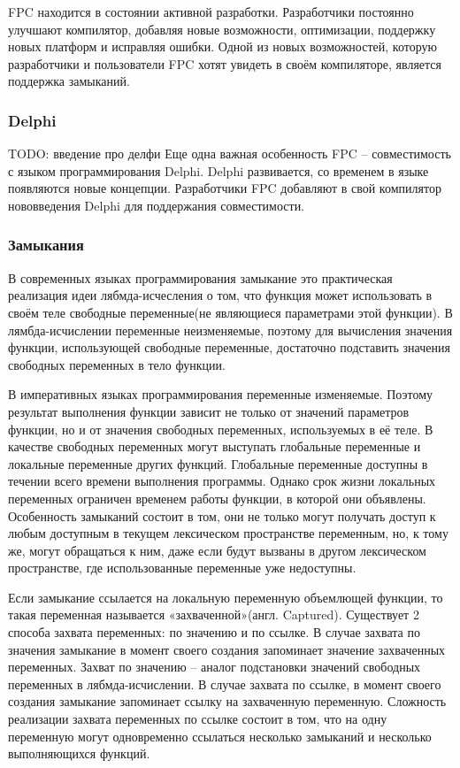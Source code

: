 \documentclass{imcs}
\begin{document}
FPC находится в состоянии активной разработки. Разработчики постоянно улучшают компилятор,
добавляя новые возможности, оптимизации, поддержку новых платформ и
исправляя ошибки\cite{fpc}.
Одной из новых возможностей, которую разработчики и пользователи FPC хотят увидеть в
своём компиляторе, является поддержка замыканий.

\subsubsection{Delphi}

TODO: введение про делфи
Еще одна важная особенность FPC -- совместимость с языком программирования Delphi.
Delphi развивается, со временем в языке появляются новые концепции. Разработчики FPC
добавляют в свой компилятор нововведения Delphi для поддержания совместимости.

\subsubsection{Замыкания}
В современных языках программирования замыкание это практическая реализация
идеи лябмда-исчесления о том, что функция может использовать в своём теле свободные
переменные(не являющиеся параметрами этой функции). В лямбда-исчислении
переменные неизменяемые, поэтому для вычисления значения функции, использующей
свободные переменные, достаточно подставить значения свободных переменных в тело
функции\cite{lambdatutor}.

В императивных языках программирования переменные изменяемые.
Поэтому результат выполнения функции зависит не только от значений параметров
функции, но и от значения свободных переменных, используемых в её теле. В качестве
свободных переменных могут выступать глобальные переменные и локальные переменные
других функций. Глобальные переменные доступны в течении всего времени выполнения программы.
Однако срок жизни
локальных переменных ограничен временем работы функции, в которой они объявлены.
Особенность замыканий состоит в том, они не только могут получать доступ к любым
доступным в текущем лексическом пространстве переменным, но, к тому же, могут
обращаться к ним, даже если будут вызваны в другом лексическом пространстве, где
использованные переменные уже недоступны.

Если замыкание ссылается на локальную переменную объемлющей функции, то такая переменная 
называется «захваченной»(англ. Captured)\cite{anonymmethods}\cite{cpp}. Существует 2
способа захвата переменных: по значению и по ссылке. В случае захвата по значения
замыкание в момент своего создания запоминает значение захваченных переменных.
Захват по значению -- аналог подстановки значений свободных переменных в лябмда-исчислении.
В случае захвата по ссылке, в момент своего создания замыкание запоминает ссылку 
на захваченную переменную. Сложность реализации захвата переменных по ссылке состоит в том,
что на одну переменную могут одновременно ссылаться несколько замыканий и несколько
выполняющихся функций.
\end{document}
